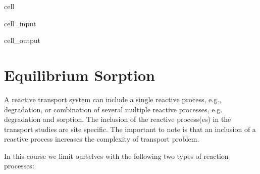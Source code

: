 \documentclass[letterpaper,10pt,english]{jupyterBook}
\begin{document}
\begin{sphinxuseclass}{cell}
\begin{sphinxVerbatimInput}
\begin{sphinxuseclass}{cell_input}
\begin{sphinxVerbatim}[commandchars=\\\{\}]
   
   
   
    
\end{sphinxVerbatim}

\end{sphinxuseclass}\end{sphinxVerbatimInput}
\begin{sphinxVerbatimOutput}

\begin{sphinxuseclass}{cell_output}
\noindent{}

\end{sphinxuseclass}\end{sphinxVerbatimOutput}

\end{sphinxuseclass}

\section{Equilibrium Sorption}
\label{\detokenize{content/transport/L10/22_reactive_transport:equilibrium-sorption}}
\sphinxAtStartPar
A reactive transport system can include a single reactive process, e.g., degradation, or combination of several multiple reactive processes, e.g. degradation and sorption. The inclusion of the reactive process(es) in the transport studies are site specific. The important to note is that an inclusion of a reactive process increases the complexity of transport problem.

\sphinxAtStartPar
In this course we limit ourselves with the following two types of reaction processes:

\sphinxAtStartPar
{}

\sphinxAtStartPar
{}
\end{document}
